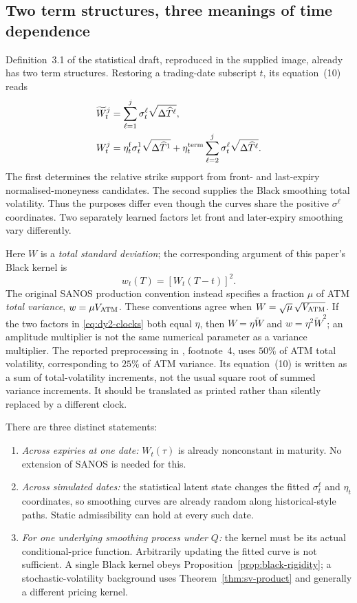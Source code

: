 \documentclass[11pt,a4paper]{article}
\numberwithin{equation}{section}
\theoremstyle{definition}\newtheorem{definition}[theorem]{Definition}
\theoremstyle{remark}\newtheorem{remark}[theorem]{Remark}
\begin{document}
\subsection{Two term structures, three meanings of time dependence}
Definition~3.1 of the statistical draft, reproduced in the supplied image, already has two term structures. Restoring a trading-date subscript $t$, its equation~(10) reads
\begin{align}
 \widetilde W_t^j&=\sum_{\ell=1}^j\sigma_t^\ell\sqrt{\Delta\widehat T^\ell},\notag\\
 W_t^j&=\eta_t^{\rm f}\sigma_t^1\sqrt{\Delta\widehat T^1}
       +\eta_t^{\rm term}\sum_{\ell=2}^j\sigma_t^\ell\sqrt{\Delta\widehat T^\ell}.
 \label{eq:dy2-clocks}
\end{align}
The first determines the relative strike support from front- and last-expiry normalised-moneyness candidates. The second supplies the Black smoothing total volatility. Thus the purposes differ even though the curves share the positive $\sigma^\ell$ coordinates. Two separately learned factors let front and later-expiry smoothing vary differently.

Here $W$ is a \emph{total standard deviation}; the corresponding argument of this paper's Black kernel is
\begin{equation}
 w_t(T)=[W_t(T-t)]^2.
 \label{eq:dy2-variance-map}
\end{equation}
The original SANOS production convention instead specifies a fraction $\mu$ of ATM \emph{total variance}, $w=\mu V_{\rm ATM}$. These conventions agree when $W=\sqrt\mu\,\sqrt{V_{\rm ATM}}$. If the two factors in \eqref{eq:dy2-clocks} both equal $\eta$, then $W=\eta\widetilde W$ and $w=\eta^2\widetilde W^2$; an amplitude multiplier is not the same numerical parameter as a variance multiplier. The reported preprocessing in \cite{DYSANOSv2}, footnote~4, uses $50\%$ of ATM total volatility, corresponding to $25\%$ of ATM variance. Its equation~(10) is written as a sum of total-volatility increments, not the usual square root of summed variance increments. It should be translated as printed rather than silently replaced by a different clock.

There are three distinct statements:
\begin{enumerate}
\item \emph{Across expiries at one date:} $W_t(\tau)$ is already nonconstant in maturity. No extension of SANOS is needed for this.
\item \emph{Across simulated dates:} the statistical latent state changes the fitted $\sigma_t^\ell$ and $\eta_t$ coordinates, so smoothing curves are already random along historical-style paths. Static admissibility can hold at every such date.
\item \emph{For one underlying smoothing process under $Q$:} the kernel must be its actual conditional-price function. Arbitrarily updating the fitted curve is not sufficient. A single Black kernel obeys Proposition~\ref{prop:black-rigidity}; a stochastic-volatility background uses Theorem~\ref{thm:sv-product} and generally a different pricing kernel.
\end{enumerate}
\end{document}
